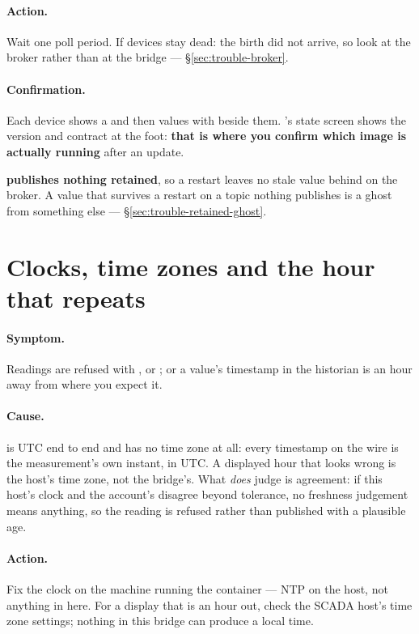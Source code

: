 \paragraph{Action.} Wait one poll period. If devices stay dead: the birth did not arrive, so
look at the broker rather than at the bridge --- \S\ref{sec:trouble-broker}.

\paragraph{Confirmation.} Each device shows a  and then values with 
beside them. \prog's state screen shows the version and contract at the foot: \textbf{that is
where you confirm which image is actually running} after an update.

\begin{note}
\textbf{\prog publishes nothing retained}, so a restart leaves no stale value behind on the
broker. A value that survives a restart on a topic nothing publishes is a ghost from something
else --- \S\ref{sec:trouble-retained-ghost}.
\end{note}

\section{Clocks, time zones and the hour that repeats}
\label{sec:trouble-clock}

\paragraph{Symptom.} Readings are refused with ,
 or ; or a value's timestamp in the
historian is an hour away from where you expect it.

\paragraph{Cause.} \prog is UTC end to end and has no time zone at all: every timestamp on the
wire is the measurement's own instant, in UTC. A displayed hour that looks wrong is the host's
time zone, not the bridge's. What \prog \emph{does} judge is agreement: if this host's clock
and the account's disagree beyond tolerance, no freshness judgement means anything, so the
reading is refused rather than published with a plausible age.

\paragraph{Action.} Fix the clock on the machine running the container --- NTP on the host,
not anything in here. For a display that is an hour out, check the SCADA host's time zone
settings; nothing in this bridge can produce a local time.

